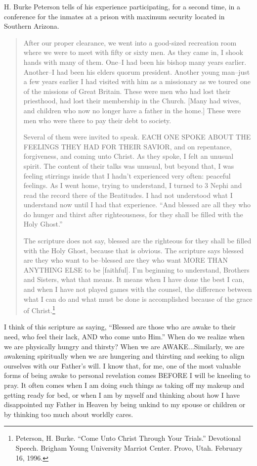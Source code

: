 			H. Burke Peterson tells of his experience participating, for a second time, in a conference for the inmates at a prison with maximum security located in Southern Arizona.

			\begin{quotation}
			After our proper clearance, we went into a good-sized recreation room where we were to meet with fifty or sixty men. As they came in, I shook hands with many of them. One--I had been his bishop many years earlier. Another--I had been his elders quorum president. Another young man--just a few years earlier I had visited with him as a missionary as we toured one of the missions of Great Britain. These were men who had lost their priesthood, had lost their membership in the Church. [Many had wives, and children who now no longer have a father in the home.] These were men who were there to pay their debt to society.

			Several of them were invited to speak. EACH ONE SPOKE ABOUT THE FEELINGS THEY HAD FOR THEIR SAVIOR, and on repentance, forgiveness, and coming unto Christ. As they spoke, I felt an unusual spirit. The content of their talks was unusual, but beyond that, I was feeling stirrings inside that I hadn't experienced very often: peaceful feelings. As I went home, trying to understand, I turned to 3 Nephi and read the record there of the Beatitudes. I had not understood what I understand now until I had that experience. ``And blessed are all they who do hunger and thirst after righteousness, for they shall be filled with the Holy Ghost.''

			The scripture does not say, blessed are the righteous for they shall be filled with the Holy Ghost, because that is obvious. The scripture says blessed are they who want to be--blessed are they who want MORE THAN ANYTHING ELSE to be [faithful]. I'm beginning to understand, Brothers and Sisters, what that means. It means when I have done the best I can, and when I have not played games with the counsel, the difference between what I can do and what must be done is accomplished because of the grace of Christ.\footnote{Peterson, H. Burke. ``Come Unto Christ Through Your Trials.'' Devotional Speech. Brigham Young University Marriot Center. Provo, Utah. February 16, 1996.}
			\end{quotation}

			I think of this scripture as saying, ``Blessed are those who are awake to their need, who feel their lack, AND who come unto Him.'' When do we realize when we are physically hungry and thirsty? When we are AWAKE...Similarly, we are awakening spiritually when we are hungering and thirsting and seeking to align ourselves with our Father's will. I know that, for me, one of the most valuable forms of being awake to personal revelation comes BEFORE I will be kneeling to pray. It often comes when I am doing such things as taking off my makeup and getting ready for bed, or when I am by myself and thinking about how I have disappointed my Father in Heaven by being unkind to my spouse or children or by thinking too much about worldly cares.

